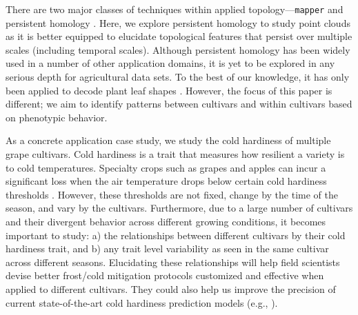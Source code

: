 There are two major classes of techniques within applied  topology---\texttt{mapper} \cite{singh_topological_2007} and persistent homology \cite{edelsbrunner_persistent_2013}. Here, we explore persistent homology to study point clouds as it is better equipped to elucidate topological features that persist over multiple scales (including temporal scales).
Although persistent homology has been widely used in a number of other application domains, it is yet to be explored in any serious depth for agricultural data sets. 
To the best of our knowledge, it has only been applied to decode plant leaf shapes \cite{zhang2021mfcis}. However, the focus of this paper is different; we aim to identify patterns between cultivars and within cultivars based on phenotypic behavior. 

As a concrete application case study, we study the cold hardiness of multiple grape cultivars.
Cold hardiness is a trait that measures how resilient a variety is to cold temperatures. Specialty crops such as grapes and apples can incur a significant loss when the air temperature drops below certain cold hardiness thresholds \cite{mills_cold-hardiness_2006}. However, these thresholds are not fixed, change by the time of the season, and vary by the cultivars. 
Furthermore, due to a large number of cultivars and their divergent behavior across different growing conditions, it becomes important to study: a) the relationships between different cultivars by their cold hardiness trait, and b) any trait level variability as seen in the same cultivar across different seasons. 
Elucidating these relationships will help field scientists devise better frost/cold mitigation protocols customized and effective when applied to different cultivars. 
They could also help us improve the precision of current state-of-the-art cold hardiness prediction models (e.g., \cite{ferguson_modeling_2014}).




